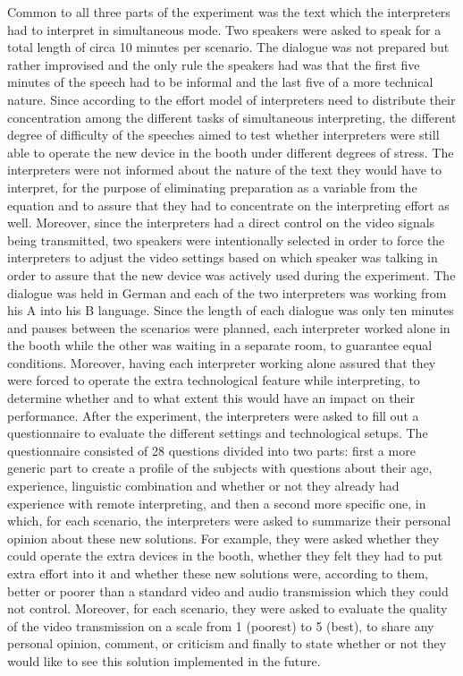\documentclass[output=paper]{langsci/langscibook}
\begin{document}
Common to all three parts of the experiment was the text which the interpreters had to interpret in simultaneous mode. Two speakers were asked to speak for a total length of circa 10 minutes per scenario. The dialogue was not prepared but rather improvised and the only rule the speakers had was that the first five minutes of the speech had to be informal and the last five of a more technical nature. Since according to the effort model of \citet{Gile2009} interpreters need to distribute their concentration among the different tasks of simultaneous interpreting, the different degree of difficulty of the speeches aimed to test whether interpreters were still able to operate the new device in the booth under different degrees of stress. The interpreters were not informed about the nature of the text they would have to interpret, for the purpose of eliminating preparation as a variable from the equation and to assure that they had to concentrate on the interpreting effort as well. Moreover, since the interpreters had a direct control on the video signals being transmitted, two speakers were intentionally selected in order to force the interpreters to adjust the video settings based on which speaker was talking in order to assure that the new device was actively used during the experiment. The dialogue was held in German and each of the two interpreters was working from his A into his B language. Since the length of each dialogue was only ten minutes and pauses between the scenarios were planned, each interpreter worked alone in the booth while the other was waiting in a separate room, to guarantee equal conditions. Moreover, having each interpreter working alone assured that they were forced to operate the extra technological feature while interpreting, to determine whether and to what extent this would have an impact on their performance. After the experiment, the interpreters were asked to fill out a questionnaire to evaluate the different settings and technological setups. The questionnaire consisted of 28 questions divided into two parts: first a more generic part to create a profile of the subjects with questions about their age, experience, linguistic combination and whether or not they already had experience with remote interpreting, and then a second more specific one, in which, for each scenario, the interpreters were asked to summarize their personal opinion about these new solutions. For example, they were asked whether they could operate the extra devices in the booth, whether they felt they had to put extra effort into it and whether these new solutions were, according to them, better or poorer than a standard video and audio transmission which they could not control. Moreover, for each scenario, they were asked to evaluate the quality of the video transmission on a scale from 1 (poorest) to 5 (best), to share any personal opinion, comment, or criticism and finally to state whether or not they would like to see this solution implemented in the future.\\
\end{document}
